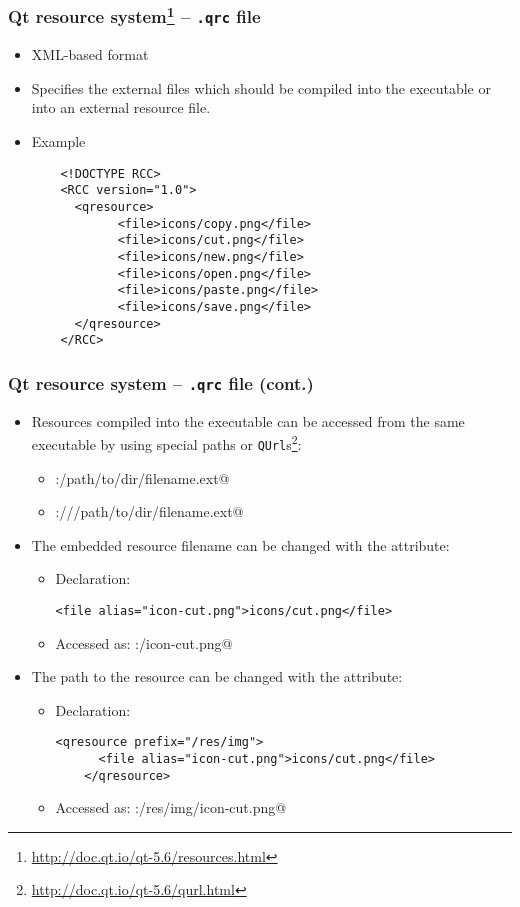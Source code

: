 \begin{frame}[fragile]
  \frametitle{Qt resource system\footnote
    {\url{http://doc.qt.io/qt-5.6/resources.html}} -- \texttt{.qrc} file}
  \small
  \begin{itemize}
    \item XML-based format
    \item Specifies the external files which should be compiled into the
      executable or into an external resource file.
    \item Example
    \begin{lstlisting}
	<!DOCTYPE RCC>
	<RCC version="1.0">
	  <qresource>
    	    <file>icons/copy.png</file>
    	    <file>icons/cut.png</file>
    	    <file>icons/new.png</file>
    	    <file>icons/open.png</file>
    	    <file>icons/paste.png</file>
    	    <file>icons/save.png</file>
	  </qresource>
	</RCC>
    \end{lstlisting}
  \end{itemize}
\end{frame}

\begin{frame}[fragile]
  \frametitle{Qt resource system -- \texttt{.qrc} file (cont.)}
  \begin{itemize}
    \footnotesize
    \item Resources compiled into the executable can be accessed from the same
      executable by using special paths or \texttt{QUrl}s\footnote
       {\url{http://doc.qt.io/qt-5.6/qurl.html}}:
      \begin{itemize}
        \item \verb@:/path/to/dir/filename.ext@
        \item \verb@qrc:///path/to/dir/filename.ext@
      \end{itemize}
    \item The embedded resource filename can be changed with the \verb@alias@
      attribute:
      \begin{itemize}
        \item Declaration:
        \begin{lstlisting}[basicstyle=\scriptsize\ttfamily]
	<file alias="icon-cut.png">icons/cut.png</file>
        \end{lstlisting}
        \item Accessed as: \verb@:/icon-cut.png@
      \end{itemize}
    \item The path to the resource can be changed with the \verb@prefix@
      attribute:
      \begin{itemize}
        \item Declaration:
        \begin{lstlisting}[basicstyle=\scriptsize\ttfamily]
	<qresource prefix="/res/img">
	  <file alias="icon-cut.png">icons/cut.png</file>
	</qresource>
        \end{lstlisting}
        \item Accessed as: \verb@:/res/img/icon-cut.png@
      \end{itemize}
  \end{itemize}
\end{frame}

